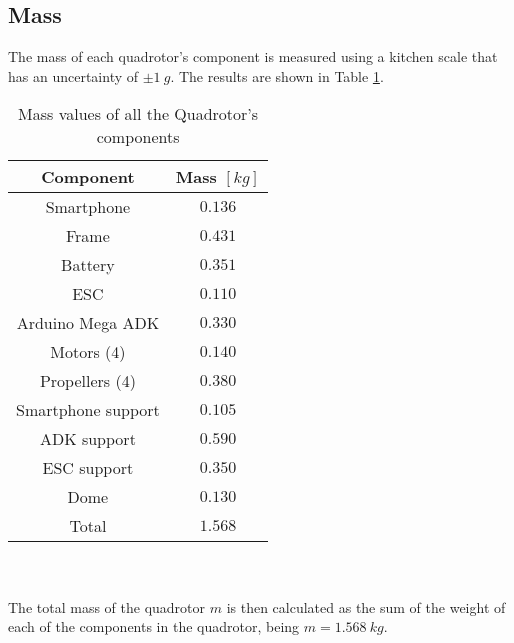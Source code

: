 \subsection{Mass}
The mass of each quadrotor's component is measured using a kitchen scale that has an uncertainty of $\pm 1\ g$. The results are shown in Table \ref{tb:mass}.
\begin{table}[h]
\small
\begin{center}
\caption{Mass values of all the Quadrotor's components}\label{tb:mass}
\begin{tabular}{c|c}\hline
\rule{0pt}{3ex} Component & Mass $[kg]$ \\\hline\hline
\rule{0pt}{3ex}Smartphone &  $0.136$ \\[0.7ex]
Frame &  $0.431$ \\[0.7ex]
Battery & $0.351$ \\[0.7ex]
ESC &  $0.110$ \\[0.7ex] 
Arduino Mega ADK &  $0.330$ \\[0.7ex]
Motors (4) & $0.140$ \\[0.7ex]
Propellers (4) &  $0.380$ \\[0.7ex]
Smartphone support &  $0.105$ \\[0.7ex]
ADK support &  $0.590$  \\[0.7ex]
ESC support &  $0.350$  \\[0.7ex]
Dome &  $0.130$ \\[0.7ex]\hline
\rule{0pt}{3ex} Total & $1.568$
\end{tabular}
\end{center}
\end{table}
\\\\The total mass of the quadrotor $m$ is then calculated as the sum of the weight of each of the components in the quadrotor, being $m = 1.568\ kg$.
